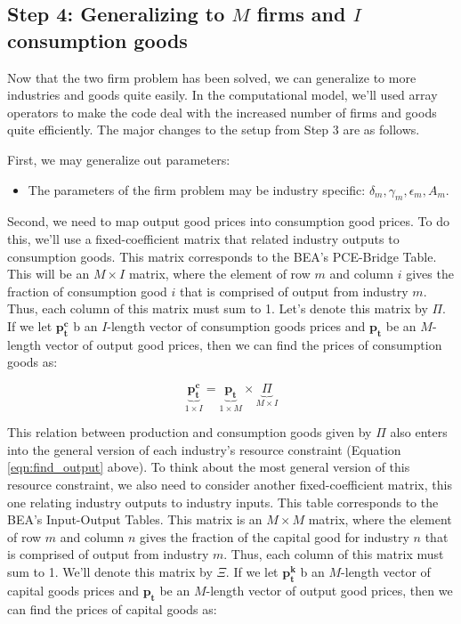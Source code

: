 \documentclass[letterpaper,12pt]{article}
\theoremstyle{definition}
\begin{document}
\begin{spacing}{1.5}
\section*{Step 4: Generalizing to $M$ firms and $I$ consumption goods}

Now that the two firm problem has been solved, we can generalize to more industries and goods quite easily.  In the computational model, we'll used array operators to make the code deal with the increased number of firms and goods quite efficiently.  The major changes to the setup from Step 3 are as follows.

First, we may generalize out parameters:
\begin{itemize}
\item The parameters of the firm problem may be industry specific: $\delta_{m}, \gamma_{m}, \epsilon_{m}, A_{m}$.
\end{itemize}

Second, we need to map output good prices into consumption good prices.  To do this, we'll use a fixed-coefficient matrix that related industry outputs to consumption goods.  This matrix corresponds to the BEA's PCE-Bridge Table.  This will be an $M\times I$ matrix, where the element of row $m$ and column $i$ gives the fraction of consumption good $i$ that is comprised of output from industry $m$.  Thus, each column of this matrix must sum to 1.  Let's denote this matrix by $\Pi$.  If we let $\boldsymbol{p^{c}_{t}}$ b an $I$-length vector of consumption goods prices and $\boldsymbol{p_{t}}$ be an $M$-length vector of output good prices, then we can find the prices of consumption goods as:

\begin{equation}
\label{eqn:capital_prices}
\underbrace{\boldsymbol{p^{c}_{t}}}_{1\times I} =\underbrace{\boldsymbol{p_{t}}}_{1\times M} \times  \underbrace{\Pi}_{M\times I}
\end{equation}

This relation between production and consumption goods given by $\Pi$ also enters into the general version of each industry's resource constraint (Equation \ref{eqn:find_output} above).   To think about the most general version of this resource constraint, we also need to consider another fixed-coefficient matrix, this one relating industry outputs to industry inputs.  This table corresponds to the BEA's Input-Output Tables.  This matrix is an $M\times M$ matrix, where the element of row $m$ and column $n$ gives the fraction of the capital good for industry $n$ that is comprised of output from industry $m$.  Thus, each column of this matrix must sum to 1.   We'll denote this matrix by $\Xi$.  If we let $\boldsymbol{p^{k}_{t}}$ b an $M$-length vector of capital goods prices and $\boldsymbol{p_{t}}$ be an $M$-length vector of output good prices, then we can find the prices of capital goods as:


\end{spacing}
\end{document}
